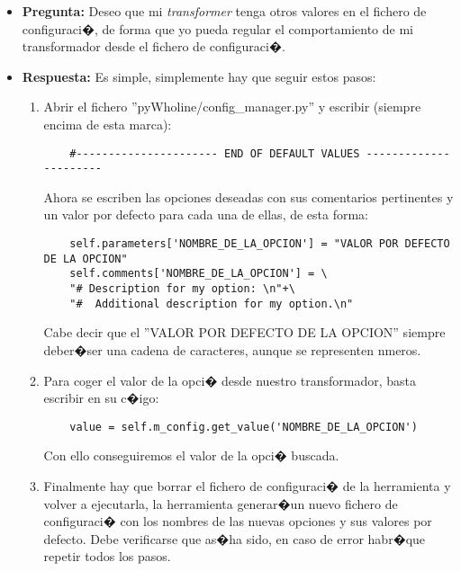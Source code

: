 \documentclass[a4paper,10pt]{book}
\begin{document}
\begin{itemize}
\item \textbf{Pregunta:} Deseo que mi \textit{transformer} tenga otros valores en el fichero de
configuraci�, de forma que yo pueda regular el comportamiento de mi transformador
desde el fichero de configuraci�.

\item \textbf{Respuesta:} Es simple, simplemente hay que seguir estos pasos:

\begin{enumerate}

\item Abrir el fichero ''pyWholine/config\_manager.py''
y escribir (siempre encima de esta marca):

    \begin{center}
    \begin{verbatim}
    #---------------------- END OF DEFAULT VALUES ----------------------
    \end{verbatim}
    \end{center}
Ahora se escriben las opciones deseadas con sus comentarios pertinentes y un valor
por defecto para cada una de ellas, de esta forma:

    \begin{verbatim}
    self.parameters['NOMBRE_DE_LA_OPCION'] = "VALOR POR DEFECTO DE LA OPCION"
    self.comments['NOMBRE_DE_LA_OPCION'] = \
    "# Description for my option: \n"+\
    "#  Additional description for my option.\n"
    \end{verbatim}

Cabe decir que el ''VALOR POR DEFECTO DE LA OPCION'' siempre deber�ser una
cadena de caracteres, aunque se representen nmeros.

\item Para coger el valor de la opci� desde nuestro transformador, basta
escribir en su c�igo:

    \begin{center}
    \begin{verbatim}
    value = self.m_config.get_value('NOMBRE_DE_LA_OPCION')
    \end{verbatim}
    \end{center}

Con ello conseguiremos el valor de la opci� buscada.

\item Finalmente hay que borrar el fichero de configuraci� de la herramienta
y volver a ejecutarla, la herramienta generar�un nuevo fichero de configuraci�
con los nombres de las nuevas opciones y sus valores por defecto. Debe verificarse
que as�ha sido, en caso de error habr�que repetir todos los pasos.

\end{enumerate}
\end{itemize}
\end{document}

